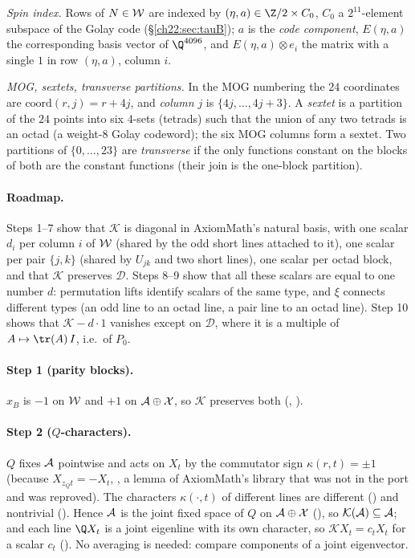 \emph{Spin index.}  Rows of $N\in\mathcal{W}$ are indexed by $(\eta,a)\in\Z/2\times C_0$, $C_0$ a $2^{11}$-element subspace of
the Golay code (\S\ref{ch22:sec:tauB}); $a$ is the \emph{code component}, $E(\eta,a)$ the corresponding basis vector of
$\Q^{4096}$, and $E(\eta,a)\otimes e_i$ the matrix with a single $1$ in row $(\eta,a)$, column $i$.

\emph{MOG, sextets, transverse partitions.}  In the MOG numbering the $24$ coordinates are $\mathrm{coord}(r,j)=r+4j$, and
\emph{column} $j$ is $\{4j,\dots,4j+3\}$.  A \emph{sextet} is a partition of the $24$ points into six $4$-sets (tetrads) such
that the union of any two tetrads is an octad (a weight-$8$ Golay codeword); the six MOG columns form a sextet.  Two
partitions of $\{0,\dots,23\}$ are \emph{transverse} if the only functions constant on the blocks of both are the constant
functions (their join is the one-block partition).

\paragraph{Roadmap.}  Steps 1--7 show that $\mathcal K$ is diagonal in AxiomMath's natural basis, with one scalar $d_i$ per column
$i$ of $\mathcal{W}$ (shared by the odd short lines attached to it), one scalar per pair $\{j,k\}$ (shared by $U_{jk}$ and two
short lines), one scalar per octad block, and that $\mathcal K$ preserves $\mathcal D$.  Steps 8--9 show that all these scalars are
equal to one number $d$: permutation lifts identify scalars of the same type, and $\xi$ connects different types (an odd line to
an octad line, a pair line to an octad line).  Step 10 shows that $\mathcal K-d\cdot1$ vanishes except on $\mathcal D$, where it is
a multiple of $A\mapsto\tr(A)\,I$, i.e.\ of $P_0$.

\paragraph{Step 1 (parity blocks).}  $x_B$ is $-1$ on $\mathcal{W}$ and $+1$ on $\mathcal{A}\oplus\mathcal{X}$, so
$\mathcal K$ preserves both (, ).

\paragraph{Step 2 ($Q$-characters).}  $Q$ fixes $\mathcal{A}$ pointwise and acts on $X_t$ by the commutator sign
$\kappa(r,t)=\pm1$ (because $X_{z_Qt}=-X_t$, , a lemma of AxiomMath's library that was not in the port
and was reproved).  The characters $\kappa(\cdot,t)$ of different lines are different () and
nontrivial ().  Hence $\mathcal{A}$ is the joint fixed space of $Q$ on
$\mathcal{A}\oplus\mathcal{X}$ (), so $\mathcal K(\mathcal{A})\subseteq\mathcal{A}$; and each line $\Q
X_t$ is a joint eigenline with its own character, so $\mathcal KX_t=c_tX_t$ for a scalar $c_t$ ().  No
averaging is needed: compare components of a joint eigenvector.

